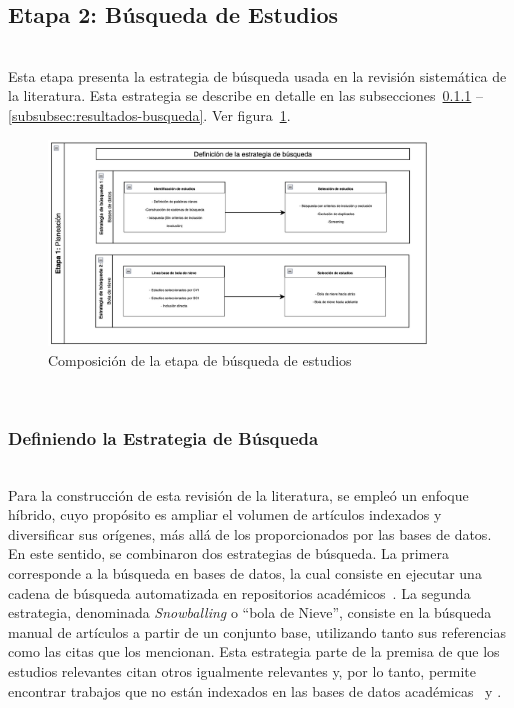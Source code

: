 \subsection{Etapa 2: Búsqueda de Estudios}
\mbox{}\\
Esta etapa presenta la estrategia de búsqueda usada en la revisión sistemática de la literatura. Esta estrategia se describe en detalle en las subsecciones~\ref{subsubsec:Definiendo la Estrategia de Busqueda} -- \ref{subsubsec:resultados-busqueda}. Ver figura~\ref{fig:etapa2}.
\begin{figure}[tbp]
    \centering
    \includegraphics[width=0.9\textwidth,height=0.3\textheight]{resources/images/planeacion/estrategias-busqueda.png}
    \caption{Composición de la etapa de búsqueda de estudios}\label{fig:etapa2}
\end{figure}
\mbox{}\\

\subsubsection{Definiendo la Estrategia de Búsqueda}\label{subsubsec:Definiendo la Estrategia de Busqueda}
\mbox{}\\
Para la construcción de esta revisión de la literatura, se empleó un enfoque híbrido, cuyo propósito es ampliar el volumen de artículos indexados y diversificar sus orígenes, más allá de los proporcionados por las bases de datos.
En este sentido, se combinaron dos estrategias de búsqueda. La primera corresponde a la búsqueda en bases de datos, la cual consiste en ejecutar una cadena de búsqueda automatizada en repositorios académicos~\cite{jalali2012systematic}.
La segunda estrategia, denominada \textit{Snowballing} o ``bola de Nieve'', consiste en la búsqueda manual de artículos a partir de un conjunto base, utilizando tanto sus referencias como las citas que los mencionan. Esta estrategia parte de la premisa de que los estudios relevantes citan otros igualmente relevantes y, por lo tanto, permite encontrar trabajos que no están indexados en las bases de datos académicas~\cite{jalali2012systematic} y \cite{goodman1961snowball}.
\mbox{}\\

